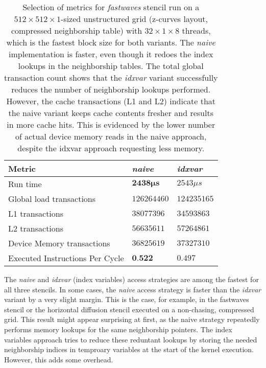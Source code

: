 \begin{table}
	\begin{tabular}{l l l}
		\hline
		\textbf{Metric} & \textbf{\emph{naive}} & \textbf{\emph{idxvar}} \\
		\hline
		\hline
		Run time & $\mathbf{2438\mu s}$ & $2543\mu s$ \\
		Global load transactions & $126264460$ & $124235165$ \\
		L1 transactions & $38077396$ & $34593863$ \\
		L2 transactions & $56635611$ & $57264861$ \\
		Device Memory transactions & $36825619$ & $37327310$ \\
		Executed Instructions Per Cycle & $\textbf{0.522}$ & $0.497$ \\
		\hline
	\end{tabular}
	\caption{\label{tab:fastwaves-naive-idxvar-metrics}Selection of metrics for \emph{fastwaves} stencil run on a $512\times 512\times 1$-sized unstructured grid (z-curves layout, compressed neighborship table) with $32\times 1\times 8$ threads, which is the fastest block size for both variants. The \emph{naive} implementation is faster, even though it redoes the index lookups in the neighborship tables. The total global transaction count shows that the \emph{idxvar} variant successfully reduces the number of neighborship lookups performed. However, the cache transactions (L1 and L2) indicate that the naive variant keeps cache contents fresher and results in more cache hits. This is evidenced by the lower number of actual device memory reads in the naive approach, despite the idxvar approach requesting less memory.}
\end{table}

The \emph{naive} and \emph{idxvar} (index variables) access strategies are among the fastest for all three stencils. In some cases, the \emph{naive} access strategy is faster than the \emph{idxvar} variant by a very slight margin. This is the case, for example, in the fastwaves stencil or the horizontal diffusion stencil executed on a non-chasing, compressed grid. This result might appear surprising at first, as the naive strategy repeatedly performs memory lookups for the same neighborship pointers. The index variables approach tries to reduce these reduntant lookups by storing the needed neighborship indices in temproary variables at the start of the kernel execution. However, this adds some overhead.

